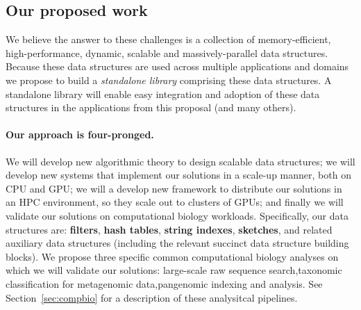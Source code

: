 \subsection{Our proposed work}

We believe the answer to  these challenges is a collection of  memory-efficient,
high-performance, dynamic, scalable and massively-parallel data structures.
Because these data structures are used across multiple applications and domains
we propose to build a \emph{standalone library} comprising these data
structures. A standalone library will enable easy integration and adoption of
these data structures in the applications from this proposal (and many others).

\paragraph{Our approach is four-pronged.}  We will develop new {algorithmic
theory} to design scalable data structures; we will develop new {systems} that
implement our solutions in a scale-up manner,  both on CPU and GPU\@; we will a
develop new framework to distribute our solutions in an {HPC} environment, so
they scale out to clusters of GPUs; and finally we will validate our solutions
on {computational biology} workloads.
%
Specifically, our data structures are: \textbf{filters}, \textbf{hash tables},
\textbf{string indexes}, \textbf{sketches}, and related auxiliary data
structures (including the relevant succinct data structure building blocks).  We propose three specific common computational biology analyses on
which we will validate our solutions: {large-scale raw sequence
search},{taxonomic classification for metagenomic data},{pangenomic indexing
and analysis}.   See Section~\ref{sec:compbio} for a description of these
analysitcal pipelines.

